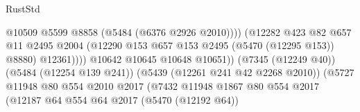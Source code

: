 \begin{lexlean}{RustStd}
\begin{coremodule}
{\begin{coremodule}
{{{{{{{{{{{{{{{{{{{{{{{{{{{{{{{                                                          @10509
                                                          @5599
                                                          @8858
                                                          (@5484 (@6376 @2926 @2010))))
                                                      (@12282
                                                        @423
                                                        @82
                                                        @657
                                                        @11
                                                        @2495
                                                        @2004
                                                        (@12290
                                                          @153
                                                          @657
                                                          @153
                                                          @2495
                                                          (@5470 (@12295 @153))
                                                          @8880)
                                                        @12361))))
                                                @10642
                                                @10645
                                                @10648
                                                @10651))
                                            (@7345 (@12249 @40))
                                            (@5484 (@12254 @139 @241))
                                            (@5439 (@12261 @241 @42 @2268 @2010))
                                            (@5727
                                              @11948
                                              @80
                                              @554
                                              @2010
                                              @2017
                                              (@7432
                                                @11948
                                                @1867
                                                @80
                                                @554
                                                @2017
                                                (@12187
                                                  @64
                                                  @554
                                                  @64
                                                  @2017
                                                  (@5470 (@12192 @64))
}}}}}}}}}}}}}}}}}}}}}}}}}}}}}}}
\end{coremodule}}
\end{coremodule}
\end{lexlean}
